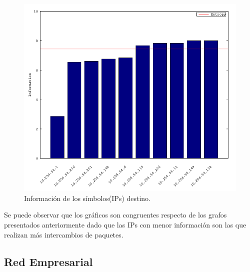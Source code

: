 \documentclass[10pt, a4paper]{article}
\begin{document}
\begin{itemize}
\begin{figure}[H] %
\begin{center}
\includegraphics[width=400pt]{../imgs/starbucks_dst_chartbar.png}
\caption{Información de los símbolos(IPs) destino.}
\end{center}
\end{figure}

\end{itemize}

Se puede observar que los gráficos son congruentes respecto de los grafos presentados anteriormente dado que las IPs con menor información son las que realizan más intercambios de paquetes.

\subsection{Red Empresarial}
\end{document}
